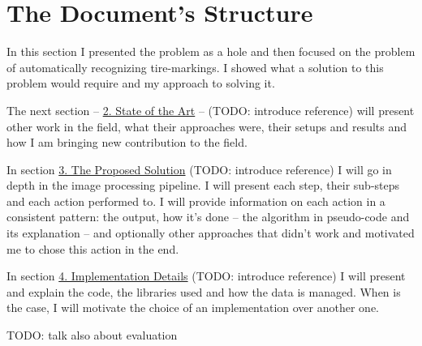 \section{The Document's Structure}

In this section I presented the problem as a hole and then focused on the problem of automatically recognizing tire-markings. I showed what a solution to this problem would require and my approach to solving it.

The next section -- \hyperref[chap:state-of-the-art]{2. State of the Art} -- (TODO: introduce reference) will present other work in the field, what their approaches were, their setups and results and how I am bringing new contribution to the field.

In section \hyperref[chap:proposed-solution]{3. The Proposed Solution} (TODO: introduce reference) I will go in depth in the image processing pipeline. I will present each step, their sub-steps and each action performed to. I will provide information on each action in a consistent pattern: the output, how it's done -- the algorithm in pseudo-code and its explanation -- and optionally other approaches that didn't work and motivated me to chose this action in the end.

In section \hyperref[chap:implementation-details]{4. Implementation Details} (TODO: introduce reference) I will present and explain the code, the libraries used and how the data is managed. When is the case, I will motivate the choice of an implementation over another one.

TODO: talk also about evaluation
